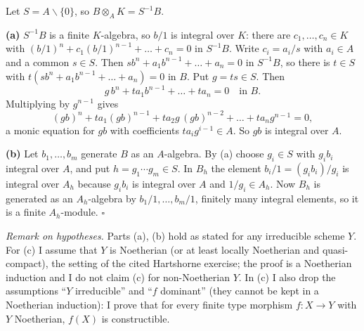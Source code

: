 \documentclass[11pt]{article}
\begin{document}
\pf
Let $S=A\smallsetminus\{0\}$, so $B\otimes_AK=S^{-1}B$.

\textbf{(a)} $S^{-1}B$ is a finite $K$-algebra, so $b/1$ is integral over $K$: there are $c_1,\dots,c_n\in K$ with $(b/1)^n+c_1(b/1)^{n-1}+\dots+c_n=0$ in $S^{-1}B$. Write $c_i=a_i/s$ with $a_i\in A$ and a common $s\in S$. Then $sb^n+a_1b^{n-1}+\dots+a_n=0$ in $S^{-1}B$, so there is $t\in S$ with $t(sb^n+a_1b^{n-1}+\dots+a_n)=0$ in $B$. Put $g=ts\in S$. Then
\[ g\,b^n+ta_1b^{n-1}+\dots+ta_n=0\quad\text{in }B. \]
Multiplying by $g^{n-1}$ gives
\[ (gb)^n+ta_1(gb)^{n-1}+ta_2g\,(gb)^{n-2}+\dots+ta_ng^{n-1}=0, \]
a monic equation for $gb$ with coefficients $ta_ig^{i-1}\in A$. So $gb$ is integral over $A$.

\textbf{(b)} Let $b_1,\dots,b_m$ generate $B$ as an $A$-algebra. By (a) choose $g_i\in S$ with $g_ib_i$ integral over $A$, and put $h=g_1\cdots g_m\in S$. In $B_h$ the element $b_i/1=(g_ib_i)/g_i$ is integral over $A_h$ because $g_ib_i$ is integral over $A$ and $1/g_i\in A_h$. Now $B_h$ is generated as an $A_h$-algebra by $b_1/1,\dots,b_m/1$, finitely many integral elements, so it is a finite $A_h$-module. \hfill$\square$

\pf
\emph{Remark on hypotheses.} Parts (a), (b) hold as stated for any irreducible scheme $Y$. For (c) I assume that $Y$ is Noetherian (or at least locally Noetherian and quasi-compact), the setting of the cited Hartshorne exercise; the proof is a Noetherian induction and I do not claim (c) for non-Noetherian $Y$. In (c) I also drop the assumptions ``$Y$ irreducible'' and ``$f$ dominant'' (they cannot be kept in a Noetherian induction): I prove that for every finite type morphism $f:X\to Y$ with $Y$ Noetherian, $f(X)$ is constructible.
\end{document}
